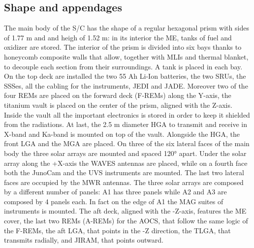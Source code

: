 \subsection{Shape and appendages}
\label{subsec:shape_appendages}


The main body of the S/C has the shape of a regular hexagonal prism with sides of 1.77 m and and heigh of 1.52 m: in its interior the ME, tanks of fuel and oxidizer are stored. The interior of the prism is divided into six bays thanks to honeycomb composite walls that allow, together with MLIs and thermal blanket, to decouple each section from their surroundings. A tank is placed in each bay. On the top deck are installed the two 55 Ah Li-Ion batteries, the two SRUs, the SSSes, all the cabling for the instruments, JEDI and JADE. Moreover two of the four REMs are placed on the forward deck (F-REMs) along the Y-axis, the titanium vault is placed on the center of the prism, aligned with the Z-axis. Inside the vault all the important electronics is stored in order to keep it shielded from the radiations. At last, the 2.5 m diameter HGA to transmit and receive in X-band and Ka-band is mounted on top of the vault. Alongside the HGA, the front LGA and the MGA are placed. On three of the six lateral faces of the main body the three solar arrays are mounted and spaced 120° apart. Under the solar array along the +X-axis the WAVES antennas are placed, while on a fourth face both the JunoCam and the UVS instruments are mounted. The last two lateral faces are occupied by the MWR antennas. The three solar arrays are composed by a different number of panels: A1 has three panels while A2 and A3 are composed by 4 panels each. In fact on the edge of A1 the MAG suites of instruments is mounted. The aft deck, aligned with the -Z-axis, features the ME cover, the last two REMs (A-REMs) for the AOCS, that follow the same logic of the F-REMs, the aft LGA, that points in the -Z direction, the TLGA, that transmits radially, and JIRAM, that points outward. 
